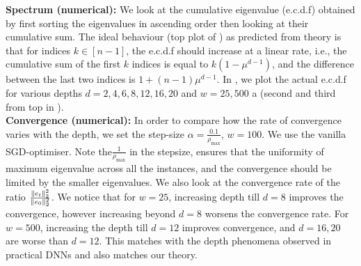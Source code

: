 \textbf{Spectrum (numerical):} We look at the cumulative eigenvalue (e.c.d.f) obtained by first sorting the eigenvalues in ascending order then looking at their cumulative sum. The ideal behaviour (top plot of ) as predicted from theory is that for indices $k\in[n-1]$, the e.c.d.f should increase at a linear rate, i.e., the cumulative sum of the first $k$ indices is equal to $k(1-\mu^{d-1})$, and the difference between the last two indices is $1+(n-1)\mu^{d-1}$. In , we plot the actual e.c.d.f for various depths $d=2,4,6,8,12,16,20$ and $w=25,500$ a (second and third from top in ). \hfill\\
\textbf{Convergence (numerical):} In order to compare how the rate of convergence varies with the depth, we set the step-size $\alpha=\frac{0.1}{\rho_{\max}}$, $w=100$. We use the vanilla SGD-optimiser. Note the$ \frac{1}{\rho_{\max}}$ in the stepsize, ensures that the uniformity of maximum eigenvalue across all the instances, and the convergence should be limited by the smaller eigenvalues. We also look at the convergence rate of the ratio $\frac{\|e_t\|^2_2}{\|e_0\|^2_2}$. We notice that for $w=25$, increasing depth till $d=8$ improves the convergence, however increasing beyond $d=8$ worsens the convergence rate. For $w=500$, increasing the depth till $d=12$ improves convergence, and $d=16,20$ are worse than $d=12$.  This matches with the depth phenomena observed in practical DNNs and also matches our theory.
